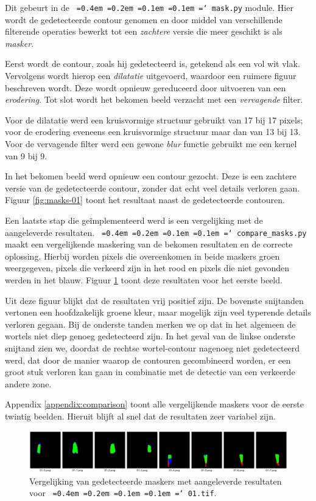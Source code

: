 \documentclass[10pt,a4paper]{article}
\newcommand*\justify{%
  \fontdimen2\font=0.4em%
  \fontdimen3\font=0.2em%
  \fontdimen4\font=0.1em%
  \fontdimen7\font=0.1em%
  \hyphenchar\font=`\-%
}
\newcommand{\ttt}[1]{{\tt \justify{#1}}}
\begin{document}
Dit gebeurt in de \ttt{mask.py} module. Hier wordt de gedetecteerde contour genomen en door middel van verschillende filterende operaties bewerkt tot een \emph{zachtere} versie die meer geschikt is als \emph{masker}. 

Eerst wordt de contour, zoals hij gedetecteerd is, getekend als een vol wit vlak. Vervolgens wordt hierop een \emph{dilatatie} uitgevoerd, waardoor een ruimere figuur beschreven wordt. Deze wordt opnieuw gereduceerd door uitvoeren van een \emph{erodering}. Tot slot wordt het bekomen beeld verzacht met een \emph{vervagende} filter.

Voor de dilatatie werd een kruisvormige structuur gebruikt van 17 bij 17 pixels; voor de erodering eveneens een kruisvormige structuur maar dan van 13 bij 13. Voor de vervagende filter werd een gewone \emph{blur} functie gebruikt me een kernel van 9 bij 9.

In het bekomen beeld werd opnieuw een contour gezocht. Deze is een zachtere versie van de gedetecteerde contour, zonder dat echt veel details verloren gaan. Figuur \ref{fig:masks-01} toont het resultaat  naast de gedetecteerde contouren.

Een laatste stap die ge\"implementeerd werd is een vergelijking met de aangeleverde resultaten. \ttt{compare\_masks.py} maakt een vergelijkende maskering van de bekomen resultaten en de correcte oplossing. Hierbij worden pixels die overeenkomen in beide maskers groen weergegeven, pixels die verkeerd zijn in het rood en pixels die niet gevonden werden in het blauw. Figuur \ref{fig:comparison-01} toont deze resultaten voor het eerste beeld.

Uit deze figuur blijkt dat de resultaten vrij positief zijn. De bovenste snijtanden vertonen een hoofdzakelijk groene kleur, maar mogelijk zijn veel typerende details verloren gegaan. Bij de onderste tanden merken we op dat in het algemeen de wortels niet diep genoeg gedetecteerd zijn. In het geval van de linkse onderste snijtand zien we, doordat de rechtse wortel-contour nagenoeg niet gedetecteerd werd, dat door de manier waarop de contouren gecombineerd worden, er een groot stuk verloren kan gaan in combinatie met de detectie van een verkeerde andere zone.

Appendix \ref{appendix:comparison} toont alle vergelijkende maskers voor de eerste twintig beelden. Hieruit blijft al snel dat de resultaten zeer variabel zijn.

\begin{figure}
  \centering
  \includegraphics[width=\linewidth]{resources/comparison-01.png}
  \caption{Vergelijking van gedetecteerde maskers met aangeleverde resultaten voor \ttt{01.tif}.}
  \label{fig:comparison-01}
\end{figure}
\end{document}
